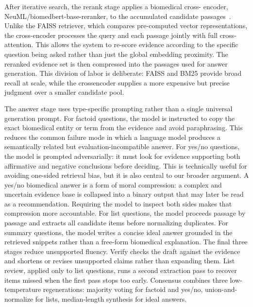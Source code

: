 \documentclass[sigconf,anonymous,review]{acmart}
\begin{document}
After iterative search, the rerank stage applies a biomedical cross-
encoder, NeuML/biomedbert-base-reranker, to the accumulated candidate passages~\cite{neuml2026reranker}. Unlike the FAISS retriever, which compares
pre-computed vector representations, the cross-encoder processes
the query and each passage jointly with full cross-attention. This
allows the system to re-score evidence according to the specific
question being asked rather than just the global embedding proximity. The reranked evidence set is then compressed into the passages
used for answer generation. This division of labor is deliberate:
FAISS and BM25 provide broad recall at scale, while the crossencoder supplies a more expensive but precise judgment over a
smaller candidate pool.

The answer stage uses type-specific prompting rather than a single universal generation prompt. For factoid questions, the model
is instructed to copy the exact biomedical entity or term from
the evidence and avoid paraphrasing. This reduces the common
failure mode in which a language model produces a semantically
related but evaluation-incompatible answer. For yes/no questions,
the model is prompted adversarially: it must look for evidence supporting both affirmative and negative conclusions before deciding.
This is technically useful for avoiding one-sided retrieval bias, but it
is also central to our broader argument. A yes/no biomedical answer
is a form of moral compression: a complex and uncertain evidence
base is collapsed into a binary output that may later be read as a
recommendation. Requiring the model to inspect both sides makes
that compression more accountable. For list questions, the model
proceeds passage by passage and extracts all candidate items before
normalizing duplicates. For summary questions, the model writes a
concise ideal answer grounded in the retrieved snippets rather than
a free-form biomedical explanation. The final three stages reduce
unsupported fluency. Verify checks the draft against the evidence
and shortens or revises unsupported claims rather than expanding
them. List review, applied only to list questions, runs a second extraction pass to recover items missed when the first pass stops too
early. Consensus combines three low-temperature regenerations:
majority voting for factoid and yes/no, union-and-normalize for
lists, median-length synthesis for ideal answers.
\end{document}
